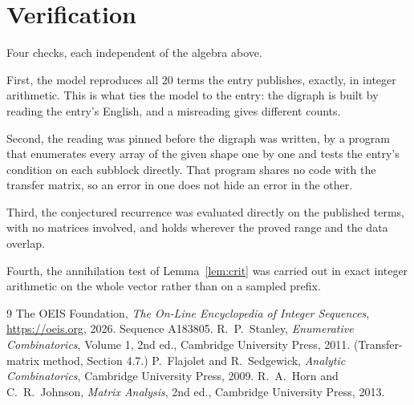 \documentclass[11pt,a4paper]{article}
\theoremstyle{plain}
\theoremstyle{definition}
\begin{document}
\section{Verification}

Four checks, each independent of the algebra above.

First, the model reproduces all $20$ terms the entry publishes, exactly, in integer
arithmetic. This is what ties the model to the entry: the digraph is built by reading the
entry's English, and a misreading gives different counts.

Second, the reading was pinned before the digraph was written, by a program that enumerates
every array of the given shape one by one and tests the entry's condition on each subblock
directly. That program shares no code with the transfer matrix, so an error in one does not
hide an error in the other.

Third, the conjectured recurrence was evaluated directly on the published terms, with no
matrices involved, and holds wherever the proved range and the data overlap.

Fourth, the annihilation test of Lemma~\ref{lem:crit} was carried out in exact integer
arithmetic on the whole vector rather than on a sampled prefix.

\begin{thebibliography}{9}
 The OEIS Foundation, \emph{The On-Line Encyclopedia of Integer
Sequences}, \url{https://oeis.org}, 2026. Sequence A183805.
 R.~P.~Stanley, \emph{Enumerative Combinatorics}, Volume 1, 2nd ed.,
Cambridge University Press, 2011. (Transfer-matrix method, Section 4.7.)
 P.~Flajolet and R.~Sedgewick, \emph{Analytic Combinatorics}, Cambridge
University Press, 2009.
 R.~A.~Horn and C.~R.~Johnson, \emph{Matrix Analysis}, 2nd ed., Cambridge
University Press, 2013.
\end{thebibliography}
\end{document}
